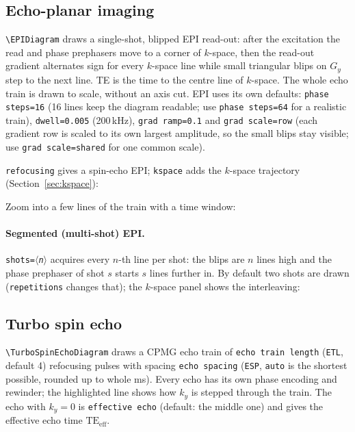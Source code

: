 \documentclass[11pt]{article}
\newcommand\cs[1]{\texttt{\textbackslash#1}}
\newcommand\key[1]{\texttt{#1}}
\newcommand\meta[1]{\ensuremath{\langle}\textit{#1}\ensuremath{\rangle}}
\begin{document}
\subsection{Echo-planar imaging}
\cs{EPIDiagram} draws a single-shot, blipped EPI read-out: after the excitation the
read and phase prephasers move to a corner of $k$-space, then the read-out
gradient alternates sign for every $k$-space line while small triangular blips on
$G_y$ step to the next line. TE is the time to the centre line of $k$-space.
The whole echo train is drawn to scale, without an axis cut.
EPI uses its own defaults: \key{phase steps=16} (16 lines keep the diagram
readable; use \key{phase steps=64} for a realistic train), \key{dwell=0.005}
(200\,kHz), \key{grad ramp=0.1} and \key{grad scale=row} (each gradient row is
scaled to its own largest amplitude, so the small blips stay visible; use
\key{grad scale=shared} for one common scale).
\begin{example}
\EPIDiagram
\end{example}
\key{refocusing} gives a spin-echo EPI; \key{kspace} adds the $k$-space
trajectory (Section~\ref{sec:kspace}):
\begin{example}
\EPIDiagram[refocusing, annotate={TE/2,TE}, values, kspace,
            rows={rf,gz,gy,gx,adc}]
\end{example}
Zoom into a few lines of the train with a time window:
\begin{example}
\EPIDiagram[detailed, rows={gy,gx,adc}, time=4:8]
\end{example}

\paragraph{Segmented (multi-shot) EPI.} \key{shots=\meta{n}} acquires every
$n$-th line per shot: the blips are $n$ lines high and the phase prephaser of
shot $s$ starts $s$ lines further in. By default two shots are drawn
(\key{repetitions} changes that); the $k$-space panel shows the interleaving:
\begin{example}
\EPIDiagram[shots=4, repetitions=4, TR=60, rows={rf,gy,gx}, kspace]
\end{example}

\subsection{Turbo spin echo}
\cs{TurboSpinEchoDiagram} draws a CPMG echo train of \key{echo train length}
(\key{ETL}, default 4) refocusing pulses with spacing \key{echo spacing}
(\key{ESP}, \texttt{auto} is the shortest possible, rounded up to whole ms).
Every echo has its own phase encoding and rewinder; the highlighted line shows how
$k_y$ is stepped through the train. The echo with $k_y=0$ is
\key{effective echo} (default: the middle one) and gives the effective echo time
$\mathrm{TE}_\mathrm{eff}$.
\begin{example}
\TurboSpinEchoDiagram[rows={rf,gz,gy,gx,sig}]
\end{example}
\end{document}
